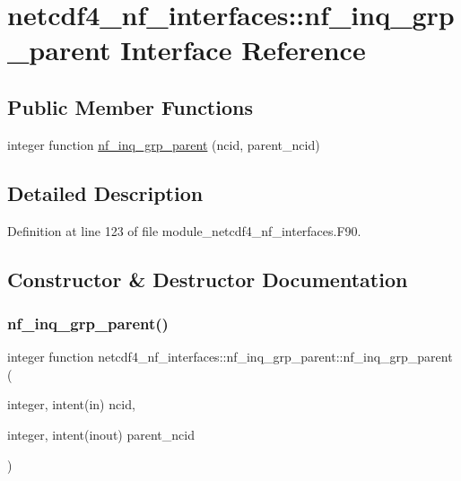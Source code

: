 \hypertarget{interfacenetcdf4__nf__interfaces_1_1nf__inq__grp__parent}{}\section{netcdf4\+\_\+nf\+\_\+interfaces\+:\+:nf\+\_\+inq\+\_\+grp\+\_\+parent Interface Reference}
\label{interfacenetcdf4__nf__interfaces_1_1nf__inq__grp__parent}
\subsection*{Public Member Functions}
\begin{DoxyCompactItemize}
\item 
integer function \hyperlink{interfacenetcdf4__nf__interfaces_1_1nf__inq__grp__parent_a15f0e884468043bea4851f30bdc76951}{nf\+\_\+inq\+\_\+grp\+\_\+parent} (ncid, parent\+\_\+ncid)
\end{DoxyCompactItemize}


\subsection{Detailed Description}


Definition at line 123 of file module\+\_\+netcdf4\+\_\+nf\+\_\+interfaces.\+F90.



\subsection{Constructor \& Destructor Documentation}
\mbox{\label{interfacenetcdf4__nf__interfaces_1_1nf__inq__grp__parent_a15f0e884468043bea4851f30bdc76951}} 
\subsubsection{\texorpdfstring{nf\+\_\+inq\+\_\+grp\+\_\+parent()}{nf\_inq\_grp\_parent()}}
{\footnotesize\ttfamily integer function netcdf4\+\_\+nf\+\_\+interfaces\+::nf\+\_\+inq\+\_\+grp\+\_\+parent\+::nf\+\_\+inq\+\_\+grp\+\_\+parent (\begin{DoxyParamCaption}\item[{integer, intent(in)}]{ncid,  }\item[{integer, intent(inout)}]{parent\+\_\+ncid }\end{DoxyParamCaption})}



